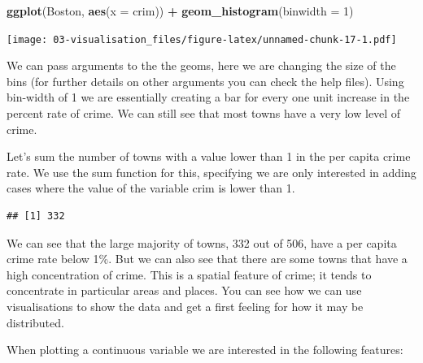 \documentclass[]{book}
\newenvironment{Shaded}{\begin{snugshade}}{\end{snugshade}}
\newcommand{\DataTypeTok}[1]{\textcolor[rgb]{0.13,0.29,0.53}{#1}}
\newcommand{\DecValTok}[1]{\textcolor[rgb]{0.00,0.00,0.81}{#1}}
\newcommand{\KeywordTok}[1]{\textcolor[rgb]{0.13,0.29,0.53}{\textbf{#1}}}
\newcommand{\NormalTok}[1]{#1}
\newcommand{\OperatorTok}[1]{\textcolor[rgb]{0.81,0.36,0.00}{\textbf{#1}}}
\newcommand{\StringTok}[1]{\textcolor[rgb]{0.31,0.60,0.02}{#1}}
\theoremstyle{definition}
\theoremstyle{definition}
\theoremstyle{definition}
\theoremstyle{remark}
\begin{document}
\begin{Shaded}
\begin{Highlighting}[]
\KeywordTok{ggplot}\NormalTok{(Boston, }\KeywordTok{aes}\NormalTok{(}\DataTypeTok{x =}\NormalTok{ crim)) }\OperatorTok{+}
\StringTok{  }\KeywordTok{geom_histogram}\NormalTok{(}\DataTypeTok{binwidth =} \DecValTok{1}\NormalTok{) }
\end{Highlighting}
\end{Shaded}

\texttt{[image: 03-visualisation\_files/figure-latex/unnamed-chunk-17-1.pdf]}

We can pass arguments to the the geoms, here we are changing the size of
the bins (for further details on other arguments you can check the help
files). Using bin-width of 1 we are essentially creating a bar for every
one unit increase in the percent rate of crime. We can still see that
most towns have a very low level of crime.

Let's sum the number of towns with a value lower than 1 in the per
capita crime rate. We use the sum function for this, specifying we are
only interested in adding cases where the value of the variable crim is
lower than 1.

\begin{Shaded}
\end{Shaded}

\begin{verbatim}
## [1] 332
\end{verbatim}

We can see that the large majority of towns, 332 out of 506, have a per
capita crime rate below 1\%. But we can also see that there are some
towns that have a high concentration of crime. This is a spatial feature
of crime; it tends to concentrate in particular areas and places. You
can see how we can use visualisations to show the data and get a first
feeling for how it may be distributed.

When plotting a continuous variable we are interested in the following
features:
\end{document}

